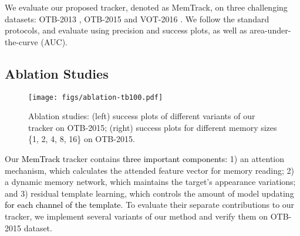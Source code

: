\documentclass[runningheads]{llncs}
\newcommand{\abc}[1]{\textcolor{black}{#1}}
\begin{document}
We evaluate our proposed tracker, denoted as MemTrack, on three challenging datasets: OTB-2013 \cite{Wu2013}, OTB-2015 \cite{Wu2015} and VOT-2016 \cite{Kristan2016}.  We follow the standard protocols, and evaluate using precision and success plots, as well as area-under-the-curve (AUC).

\subsection{Ablation Studies}\label{abla}


\begin{figure}[t]
	\begin{center}
		\texttt{[image: figs/ablation-tb100.pdf]}
	\end{center}
	\caption{Ablation studies: (left) success plots of different variants of our tracker on OTB-2015; (right) success plots for different memory sizes \{1, 2, 4, 8, 16\} on OTB-2015. 
	}
	\label{fig:7}
\end{figure}

Our \abc{MemTrack} tracker contains \abc{three important components:} 1) an attention mechanism, which calculates the attended feature vector for memory reading; 2) a dynamic memory network, which maintains the target's appearance variations; and 3) residual template learning, which controls the amount of model updating \abc{for each channel of the template}. To evaluate their separate contributions to our tracker, we implement several variants of our method and verify them on OTB-2015 dataset. 
\end{document}
